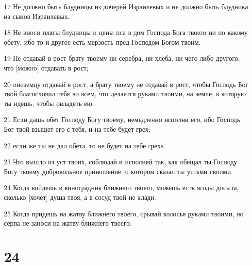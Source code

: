 \par 17 Не должно быть блудницы из дочерей Израилевых и не должно быть блудника из сынов Израилевых.
\par 18 Не вноси платы блудницы и цены пса в дом Господа Бога твоего ни по какому обету, ибо то и другое есть мерзость пред Господом Богом твоим.
\par 19 Не отдавай в рост брату твоему ни серебра, ни хлеба, ни чего-либо другого, что [можно] отдавать в рост;
\par 20 иноземцу отдавай в рост, а брату твоему не отдавай в рост, чтобы Господь Бог твой благословил тебя во всем, что делается руками твоими, на земле, в которую ты идешь, чтобы овладеть ею.
\par 21 Если дашь обет Господу Богу твоему, немедленно исполни его, ибо Господь Бог твой взыщет его с тебя, и на тебе будет грех;
\par 22 если же ты не дал обета, то не будет на тебе греха.
\par 23 Что вышло из уст твоих, соблюдай и исполняй так, как обещал ты Господу Богу твоему добровольное приношение, о котором сказал ты устами своими.
\par 24 Когда войдешь в виноградник ближнего твоего, можешь есть ягоды досыта, сколько [хочет] душа твоя, а в сосуд твой не клади.
\par 25 Когда придешь на жатву ближнего твоего, срывай колосья руками твоими, но серпа не заноси на жатву ближнего твоего.

\chapter{24}

